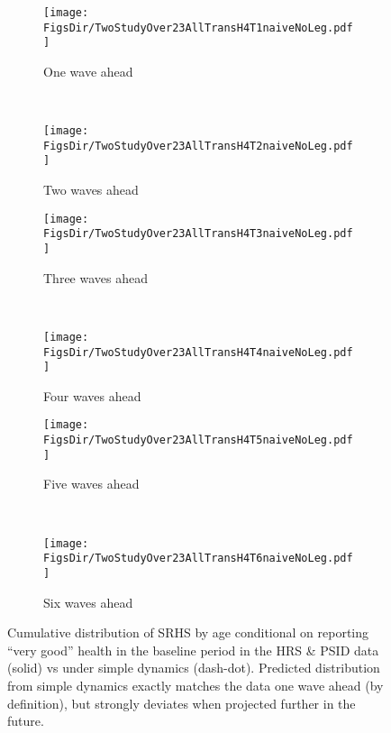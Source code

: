 \documentclass[12pt,pdftex,letterpaper]{article}
\newcommand{\RootDir}{..}
\newcommand{\FigsDir}{\RootDir/Figures}
\begin{document}
\begin{figure}[h!]
	\centering
	\begin{subfigure}[b]{0.45\textwidth}
		\texttt{[image: \\FigsDir/TwoStudyOver23AllTransH4T1naiveNoLeg.pdf]}
		\caption{One wave ahead}\label{fig:Naive1AheadVeryGood}
	\end{subfigure}
	~
	\begin{subfigure}[b]{0.45\textwidth}
		\texttt{[image: \\FigsDir/TwoStudyOver23AllTransH4T2naiveNoLeg.pdf]}
		\caption{Two waves ahead}\label{fig:Naive2AheadVeryGood}
	\end{subfigure}
	
	\begin{subfigure}[b]{0.45\textwidth}
		\texttt{[image: \\FigsDir/TwoStudyOver23AllTransH4T3naiveNoLeg.pdf]}
		\caption{Three waves ahead}\label{fig:Naive3AheadVeryGood}
	\end{subfigure}
	~
	\begin{subfigure}[b]{0.45\textwidth}
		\texttt{[image: \\FigsDir/TwoStudyOver23AllTransH4T4naiveNoLeg.pdf]}
		\caption{Four waves ahead}\label{fig:Naive4AheadVeryGood}
	\end{subfigure}
	
	\begin{subfigure}[b]{0.45\textwidth}
		\texttt{[image: \\FigsDir/TwoStudyOver23AllTransH4T5naiveNoLeg.pdf]}
		\caption{Five waves ahead}\label{fig:Naive5AheadVeryGood}
	\end{subfigure}
	~
	\begin{subfigure}[b]{0.45\textwidth}
		\texttt{[image: \\FigsDir/TwoStudyOver23AllTransH4T6naiveNoLeg.pdf]}
		\caption{Six waves ahead}\label{fig:Naive6AheadVeryGood}
	\end{subfigure}
	\caption{Cumulative distribution of SRHS by age conditional on reporting ``very good'' health in the baseline period in the HRS \& PSID data (solid) vs under simple dynamics (dash-dot).  Predicted distribution from simple dynamics exactly matches the data one wave ahead (by definition), but strongly deviates when projected further in the future.}\label{fig:NaiveTransVG}
\end{figure}
\end{document}
